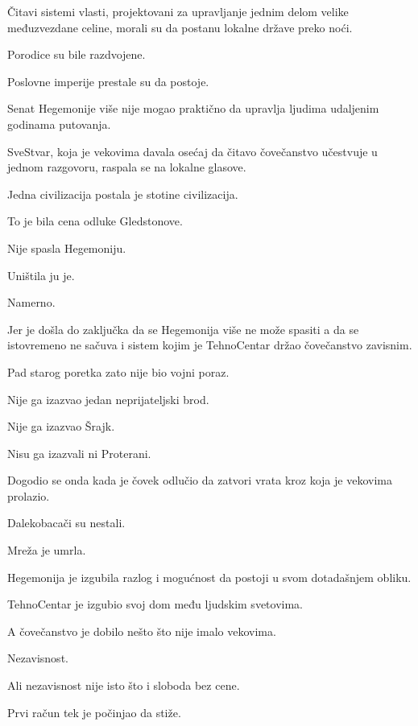 Čitavi sistemi vlasti, projektovani za upravljanje jednim delom velike međuzvezdane celine, morali su da postanu lokalne države preko noći.

\bigskip

Porodice su bile razdvojene.

Poslovne imperije prestale su da postoje.

Senat Hegemonije više nije mogao praktično da upravlja ljudima udaljenim godinama putovanja.

SveStvar, koja je vekovima davala osećaj da čitavo čovečanstvo učestvuje u jednom razgovoru, raspala se na lokalne glasove.

Jedna civilizacija postala je stotine civilizacija.

\bigskip

To je bila cena odluke Gledstonove.

Nije spasla Hegemoniju.

Uništila ju je.

Namerno.

Jer je došla do zaključka da se Hegemonija više ne može spasiti a da se istovremeno ne sačuva i sistem kojim je TehnoCentar držao čovečanstvo zavisnim.

\bigskip

Pad starog poretka zato nije bio vojni poraz.

Nije ga izazvao jedan neprijateljski brod.

Nije ga izazvao Šrajk.

Nisu ga izazvali ni Proterani.

Dogodio se onda kada je čovek odlučio da zatvori vrata kroz koja je vekovima prolazio.

\bigskip

Dalekobacači su nestali.

Mreža je umrla.

Hegemonija je izgubila razlog i mogućnost da postoji u svom dotadašnjem obliku.

TehnoCentar je izgubio svoj dom među ljudskim svetovima.

A čovečanstvo je dobilo nešto što nije imalo vekovima.

Nezavisnost.

\bigskip

Ali nezavisnost nije isto što i sloboda bez cene.

Prvi račun tek je počinjao da stiže.